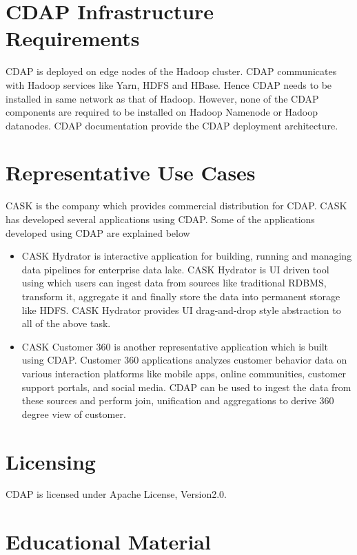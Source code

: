 \documentclass[9pt,twocolumn,twoside]{../../styles/osajnl}
\begin{document}
\section{CDAP Infrastructure Requirements}

CDAP is deployed on edge nodes of the Hadoop cluster. CDAP communicates with
Hadoop services like Yarn, HDFS and HBase. Hence CDAP needs to be installed
in same network as that of Hadoop. However, none of the CDAP components are
required to be installed on Hadoop Namenode or Hadoop datanodes. CDAP
documentation \cite{www-cdap-deployment} provide the CDAP deployment
architecture.

\section{Representative Use Cases}

CASK \cite{www-cask-io} is the company which provides commercial distribution
for CDAP. CASK has developed several applications using CDAP.
Some of the applications developed using CDAP are explained below
\begin{itemize}
\item CASK Hydrator \cite{www-cask-hydrator} is interactive application for
building, running and managing data pipelines for enterprise data lake.
CASK Hydrator is UI driven tool using which users can ingest data from
sources like traditional RDBMS, transform it,
aggregate it and finally store the data into permanent storage like HDFS.
CASK Hydrator provides UI drag-and-drop style abstraction to all of the above
 task.
\item CASK Customer 360 \cite{www-cask-customer360} is another representative
 application which is built using CDAP. Customer 360 applications analyzes
 customer behavior data on various interaction platforms like mobile apps,
 online communities, customer support portals, and social media. CDAP can be
 used to ingest the data from these sources and perform join, unification and
  aggregations to derive 360 degree view of customer.
\end{itemize}

\section{Licensing}
CDAP is licensed \cite{www-cdap-license}under Apache License, Version2.0.

\section{Educational Material}
\end{document}
